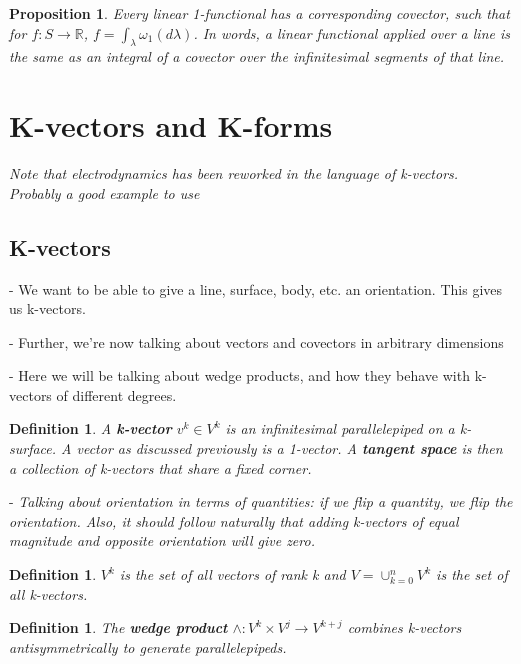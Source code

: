 \documentclass{book}
\newtheorem{defn}[equation]{Definition}
\newtheorem{prop}[equation]{Proposition}
\begin{document}
\begin{prop}
	Every linear 1-functional has a corresponding covector, such that for $f : S \to \mathbb{R}$, $f = \int_{\lambda} \omega_1(d\lambda)$. In words, a linear functional applied over a line is the same as an integral of a covector over the infinitesimal segments of that line. 
\end{prop}





\section{K-vectors and K-forms}

\emph{Note that electrodynamics has been reworked in the language of k-vectors. Probably a good example to use}




\subsection{K-vectors}

- We want to be able to give a line, surface, body, etc. an orientation. This gives us k-vectors.

- Further, we're now talking about vectors and covectors in arbitrary dimensions

- Here we will be talking about wedge products, and how they behave with k-vectors of different degrees. 



\begin{defn}
	A \textbf{k-vector} $v^k \in V^k$ is an infinitesimal parallelepiped on a k-surface. A vector as discussed previously is a 1-vector. A \textbf{tangent space} is then a collection of k-vectors that share a fixed corner. 
\end{defn}

- \emph{Talking about orientation in terms of quantities: if we flip a quantity, we flip the orientation. Also, it should follow naturally that adding k-vectors of equal magnitude and opposite orientation will give zero.}



\begin{defn}
	$V^k$ is the set of all vectors of rank k and $V = \cup_{k=0}^n V^k$ is the set of all k-vectors. 
	\end{defn}



\begin{defn}
	
	The \textbf{wedge product} $\wedge : V^k\times V^j \to V^{k+j}$ combines k-vectors antisymmetrically to generate parallelepipeds. 
\end{defn}
\end{document}
